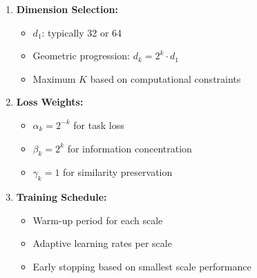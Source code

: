 \begin{enumerate}
    \item \textbf{Dimension Selection:}
    \begin{itemize}
        \item $d_1$: typically 32 or 64
        \item Geometric progression: $d_k = 2^k \cdot d_1$
        \item Maximum $K$ based on computational constraints
    \end{itemize}

    \item \textbf{Loss Weights:}
    \begin{itemize}
        \item $\alpha_k = 2^{-k}$ for task loss
        \item $\beta_k = 2^k$ for information concentration
        \item $\gamma_k = 1$ for similarity preservation
    \end{itemize}

    \item \textbf{Training Schedule:}
    \begin{itemize}
        \item Warm-up period for each scale
        \item Adaptive learning rates per scale
        \item Early stopping based on smallest scale performance
    \end{itemize}
\end{enumerate}